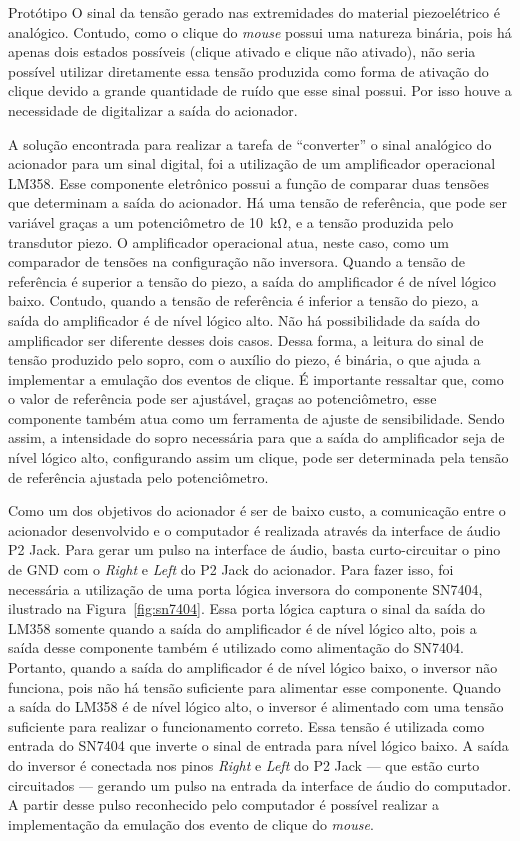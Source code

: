\begin{chapter}{Protótipo}
O sinal da tensão gerado nas extremidades do material piezoelétrico é analógico.
Contudo, como o clique do \textit{mouse} possui uma natureza binária, pois há
apenas dois estados possíveis (clique ativado e clique não ativado), não
seria possível utilizar diretamente essa tensão produzida como forma de ativação
do clique devido a grande quantidade de ruído que esse sinal possui. Por isso 
houve a necessidade de digitalizar a saída do acionador.

A solução encontrada para realizar a tarefa de ``converter'' o sinal analógico
do acionador para um sinal digital, foi a utilização de um amplificador
operacional LM358. Esse componente eletrônico possui a função de comparar duas
tensões que determinam a saída do acionador. Há uma tensão de referência, que
pode ser variável graças a um potenciômetro de 10~k\si{\ohm}, e a tensão
produzida pelo transdutor piezo. O amplificador operacional atua, neste caso,
como um comparador de tensões na configuração não inversora. Quando a tensão de
referência é superior a tensão do piezo, a saída do amplificador é de nível
lógico baixo. Contudo, quando a tensão de referência é inferior a tensão do
piezo, a saída do amplificador é de nível lógico alto. Não há possibilidade da
saída do amplificador ser diferente desses dois casos. Dessa forma, a leitura do
sinal de tensão produzido pelo sopro, com o auxílio do piezo, é binária, o que
ajuda a implementar a emulação dos eventos de clique. É importante ressaltar
que, como o valor de referência pode ser ajustável, graças ao potenciômetro,
esse componente também atua como um ferramenta de ajuste de sensibilidade. Sendo
assim, a intensidade do sopro necessária para que a saída do amplificador seja
de nível lógico alto, configurando assim um clique, pode ser determinada pela
tensão de referência ajustada pelo potenciômetro.

Como um dos objetivos do acionador é ser de baixo custo, a comunicação entre o
acionador desenvolvido e o computador é realizada através da interface de áudio
P2 Jack. Para gerar um pulso na interface de áudio, basta curto-circuitar o pino
de GND com o \textit{Right} e \textit{Left} do P2 Jack do acionador. Para fazer
isso, foi necessária a utilização de uma porta lógica inversora do componente
SN7404, ilustrado na Figura~\ref{fig:sn7404}. Essa porta lógica captura o sinal
da saída do LM358 somente quando a saída do amplificador é de nível lógico alto,
pois a saída desse componente também é utilizado como alimentação do SN7404.
Portanto, quando a saída do amplificador é de nível lógico baixo, o inversor não
funciona, pois não há tensão suficiente para alimentar esse componente. Quando a
saída do LM358 é de nível lógico alto, o inversor é alimentado com uma tensão
suficiente para realizar o funcionamento correto. Essa tensão é utilizada como
entrada do SN7404 que inverte o sinal de entrada para nível lógico baixo. A
saída do inversor é conectada nos pinos  \textit{Right} e \textit{Left} do P2
Jack --- que estão curto circuitados --- gerando um pulso na entrada da
interface de áudio do computador. A partir desse pulso reconhecido pelo
computador é possível realizar a implementação da emulação dos evento de clique
do \textit{mouse}.


\end{chapter}
